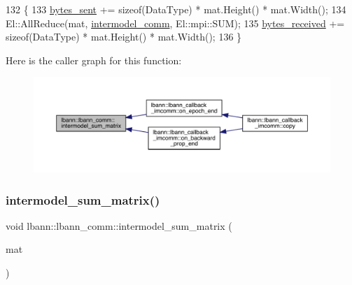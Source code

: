 \begin{DoxyCode}
132                                                \{
133   \hyperlink{classlbann_1_1lbann__comm_ad1f146ae7337ece6266fd307944928e0}{bytes\_sent} += \textcolor{keyword}{sizeof}(DataType) * mat.Height() * mat.Width();
134   El::AllReduce(mat, \hyperlink{classlbann_1_1lbann__comm_a2c51c5d8faf4f0ab4f43b892c55e597b}{intermodel\_comm}, El::mpi::SUM);
135   \hyperlink{classlbann_1_1lbann__comm_afb99f57f7eafc0695bf28e6c26a8120f}{bytes\_received} += \textcolor{keyword}{sizeof}(DataType) * mat.Height() * mat.Width();
136 \}
\end{DoxyCode}
Here is the caller graph for this function\+:\nopagebreak
\begin{figure}[H]
\begin{center}
\leavevmode
\includegraphics[width=350pt]{classlbann_1_1lbann__comm_a68b36ba64db34f33cb135bc64c4623e0_icgraph}
\end{center}
\end{figure}
\mbox{\label{classlbann_1_1lbann__comm_a55edcd98bf4903235ed11eb7c96f5eb4}} 
\subsubsection{\texorpdfstring{intermodel\+\_\+sum\+\_\+matrix()}{intermodel\_sum\_matrix()}\hspace{0.1cm}{\footnotesize\ttfamily [2/2]}}
{\footnotesize\ttfamily void lbann\+::lbann\+\_\+comm\+::intermodel\+\_\+sum\+\_\+matrix (\begin{DoxyParamCaption}\item[{\hyperlink{base_8hpp_a9a697a504ae84010e7439ffec862b470}{Abs\+Dist\+Mat} \&}]{mat }\end{DoxyParamCaption})}



